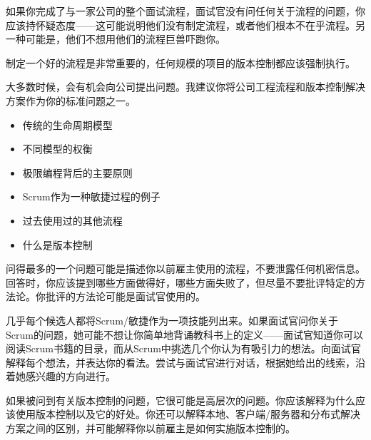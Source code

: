 
如果你完成了与一家公司的整个面试流程，面试官没有问任何关于流程的问题，你应该持怀疑态度——这可能说明他们没有制定流程，或者他们根本不在乎流程。另一种可能是，他们不想用他们的流程巨兽吓跑你。

制定一个好的流程是非常重要的，任何规模的项目的版本控制都应该强制执行。

大多数时候，会有机会向公司提出问题。我建议你将公司工程流程和版本控制解决方案作为你的标准问题之一。


\begin{itemize}
\item
传统的生命周期模型

\item
不同模型的权衡

\item
极限编程背后的主要原则

\item
Scrum作为一种敏捷过程的例子

\item
过去使用过的其他流程

\item
什么是版本控制
\end{itemize}


问得最多的一个问题可能是描述你以前雇主使用的流程，不要泄露任何机密信息。回答时，你应该提到哪些方面做得好，哪些方面失败了，但尽量不要批评特定的方法论。你批评的方法论可能是面试官使用的。

几乎每个候选人都将Scrum/敏捷作为一项技能列出来。如果面试官问你关于Scrum的问题，她可能不想让你简单地背诵教科书上的定义——面试官知道你可以阅读Scrum书籍的目录，而从Scrum中挑选几个你认为有吸引力的想法。向面试官解释每个想法，并表达你的看法。尝试与面试官进行对话，根据她给出的线索，沿着她感兴趣的方向进行。

如果被问到有关版本控制的问题，它很可能是高层次的问题。你应该解释为什么应该使用版本控制以及它的好处。你还可以解释本地、客户端/服务器和分布式解决方案之间的区别，并可能解释你以前雇主是如何实施版本控制的。

